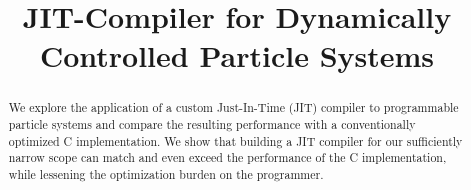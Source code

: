 \documentclass[letterpaper]{article}
\title{JIT-Compiler for Dynamically Controlled Particle Systems}
\begin{document}
%
\maketitle
%

\begin{abstract}
We explore the application of a custom Just-In-Time (JIT) compiler to
programmable particle systems and compare the resulting performance with
a conventionally optimized C implementation. We show that building a JIT
compiler for our sufficiently narrow scope can match and even exceed the
performance of the C implementation, while lessening the optimization
burden on the programmer.

\end{abstract}
















\end{document}
